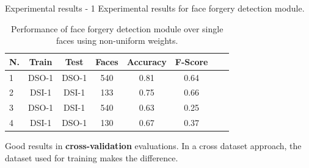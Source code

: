 \begin{tframe}{Experimental results - 1}
Experimental results for face forgery detection module.
\begin{footnotesize}
\begin{table}[h!]
\centering
\begin{tabular}{l c c c c c c c} 
\hline \hline 
\textbf{N.} & \textbf{Train} & \textbf{Test} & \textbf{Faces} & \textbf{Accuracy} & \textbf{F-Score} \\ [0.5ex]
\hline
1 & DSO-1 & DSO-1 &	540 & 0.81	& 0.64\\
2 & DSI-1 & DSI-1 &	133 & 0.75 & 0.66\\
3 &	DSO-1 & DSI-1 & 540 & 0.63 & 0.25\\ 
4 &	DSI-1 &	DSO-1 &	130 & 0.67 & 0.37\\[1ex]

\hline
\end{tabular}
\caption{Performance of face forgery detection module over single faces using non-uniform weights.}
\label{table:forgerydetections}
\end{table}
\end{footnotesize}
\vspace{0.2cm}
Good results in \textbf{cross-validation} evaluations. In a cross dataset approach, the dataset used for training makes the difference.
\end{tframe}


